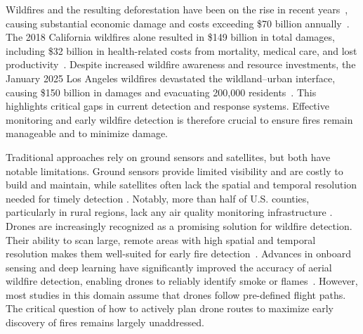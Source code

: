 \documentclass{article}
\begin{document}
Wildfires and the resulting deforestation have been on the rise in recent years~\citep{curtis2018classifying, tyukavina2022global, hu2025coexposure}, causing substantial economic damage and costs exceeding \$70 billion annually~\citep{thomas2017costs}. The 2018 California wildfires alone resulted in \$149 billion in total damages, including \$32 billion in health-related costs from mortality, medical care, and lost productivity~\citep{wang2021economic}. Despite increased wildfire awareness and resource investments, the January 2025 Los Angeles wildfires devastated the wildland–urban interface, causing \$150 billion in damages and evacuating 200,000 residents~\citep{diGiuseppe2025california}. This highlights critical gaps in current detection and response systems. Effective monitoring and early wildfire detection is therefore crucial to ensure fires remain manageable and to minimize damage.

Traditional approaches rely on ground sensors and satellites, but both have notable limitations. Ground sensors provide limited visibility and are costly to build and maintain, while satellites often lack the spatial and temporal resolution needed for timely detection \citep{WildfireDetectionBouguettaya}. Notably, more than half of U.S. counties, particularly in rural regions, lack any air quality monitoring infrastructure \citep{roque2025identifying}. Drones are increasingly recognized as a promising solution for wildfire detection. Their ability to scan large, remote areas with high spatial and temporal resolution makes them well-suited for early fire detection~\citep{WildfireDetectionBouguettaya, WildfireDetectionDLGhali22}. Advances in onboard sensing and deep learning have significantly improved the accuracy of aerial wildfire detection, enabling drones to reliably identify smoke or flames~\cite{WildfireDetectionDLGhali22, WildfireDetectionDLKim, WildfireDetectionDLKumar24, WildfireDetectionDLYandouzi22, WildfireDetectionDLYang}. However, most studies in this domain assume that drones follow pre-defined flight paths. The critical question of how to actively plan drone routes to maximize early discovery of fires remains largely unaddressed. 
\end{document}
